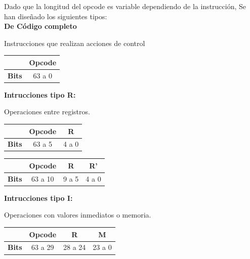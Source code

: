 \documentclass{article}
\begin{document}
Dado que la longitud del opcode
es variable dependiendo de la instrucción,
Se han diseñado los siguientes tipos:\\

\textbf{De Código completo}

Instrucciones que realizan acciones de control

\begin{table}[H]
  \centering
  \begin{tabular}{|c|c|}
    \hline
                  & \textbf{Opcode} \\ \hline
    \textbf{Bits} & 63 a 0          \\
    \hline
  \end{tabular}
\end{table}

\textbf{Intrucciones tipo R:}

Operaciones entre registros.

\begin{table}[H]
  \centering
  \begin{tabular}{|c|c|c|}
    \hline
                  & \textbf{Opcode} & \textbf{R} \\ \hline
    \textbf{Bits} & 63 a 5          & 4 a 0      \\
    \hline
  \end{tabular}
\end{table}

\begin{table}[H]
  \centering
  \begin{tabular}{|c|c|c|c|}
    \hline
                  & \textbf{Opcode} & \textbf{R} & \textbf{R'} \\ \hline
    \textbf{Bits} & 63 a 10         & 9 a 5      & 4 a 0       \\
    \hline
  \end{tabular}
\end{table}


\textbf{Intrucciones tipo I:}

Operaciones con valores inmediatos o memoria.

\begin{table}[H]
  \centering
  \begin{tabular}{|c|c|c|c|}
    \hline
                  & \textbf{Opcode} & \textbf{R} & \textbf{M} \\ \hline
    \textbf{Bits} & 63 a 29         & 28 a 24    & 23 a 0     \\
    \hline
  \end{tabular}
\end{table}
\end{document}
